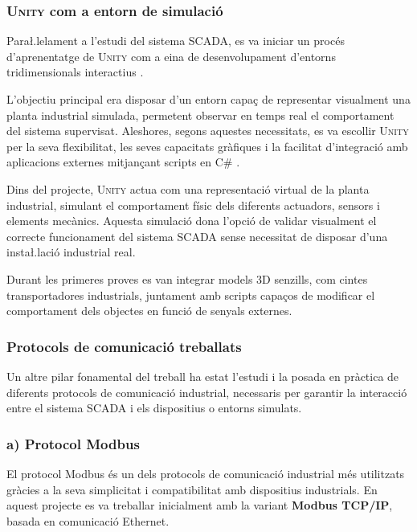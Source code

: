 \documentclass[a4paper,11pt,DIV=13,headings=normal,abstract=true,twoside=semi]{article}
\newcommand{\acro}[1]{\textsc{#1}}
\begin{document}
\subsubsection{\acro{Unity} com a entorn de simulació}
\label{sec:unity_research}

Para\l.lelament a l'estudi del sistema \acro{SCADA}, es va iniciar un procés d'aprenentatge de \acro{Unity} com a eina de desenvolupament d'entorns tridimensionals interactius \cite{Unity,UnityOfficial}.

L'objectiu principal era disposar d'un entorn capaç de representar visualment una planta industrial simulada, permetent observar en temps real el comportament del sistema supervisat. Aleshores, segons aquestes necessitats, es va escollir \acro{Unity}  per la seva flexibilitat, les seves capacitats gràfiques i la facilitat d'integració amb aplicacions externes mitjançant scripts en C\# \cite{UnityProgrammingGuide}.

Dins del projecte, \acro{Unity} actua com una representació virtual de la planta industrial, simulant el comportament físic dels diferents actuadors, sensors i elements mecànics. Aquesta simulació dona l'opció de validar visualment el correcte funcionament del sistema \acro{SCADA} sense necessitat de disposar d'una insta\l.lació industrial real.

Durant les primeres proves es van integrar models 3D senzills, com cintes transportadores industrials, juntament amb scripts capaços de modificar el comportament dels objectes en funció de senyals externes. %

\subsubsection{Protocols de comunicació treballats}

Un altre pilar fonamental del treball ha estat l'estudi i la posada en pràctica de diferents protocols de comunicació industrial, necessaris per garantir la interacció entre el sistema \acro{SCADA} i els dispositius o entorns simulats.

\subsubsection*{a) Protocol Modbus}

El protocol Modbus és un dels protocols de comunicació industrial més utilitzats gràcies a la seva simplicitat i compatibilitat amb dispositius industrials. En aquest projecte es va treballar inicialment amb la variant \textbf{Modbus TCP/IP}, basada en comunicació Ethernet.
\end{document}
